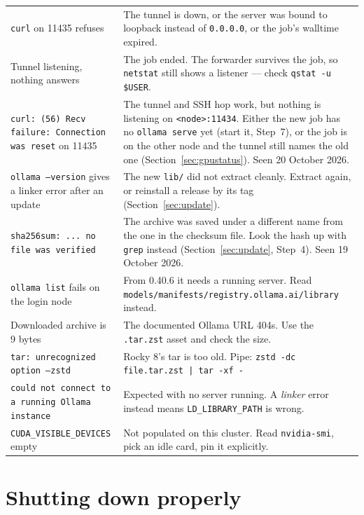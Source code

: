 \documentclass[11pt,a4paper]{article}
\begin{document}
\begin{center}
\begin{tabularx}{\linewidth}{@{}>{\raggedright\arraybackslash}p{4.6cm} X@{}}
\texttt{curl} on 11435 refuses & The tunnel is down, or the server was bound to
loopback instead of \texttt{0.0.0.0}, or the job's walltime expired. \\
Tunnel listening, nothing answers & The job ended. The forwarder survives the
job, so \texttt{netstat} still shows a listener --- check \texttt{qstat -u
\$USER}. \\
\texttt{curl: (56) Recv failure: Connection was reset} on 11435 & The tunnel
and SSH hop work, but nothing is listening on \texttt{<node>:11434}. Either the
new job has no \texttt{ollama serve} yet (start it, Step~7), or the job is on
the other node and the tunnel still names the old one
(Section~\ref{sec:gpustatus}). Seen 20 October 2026. \\
\texttt{ollama --version} gives a linker error after an update & The new
\texttt{lib/} did not extract cleanly. Extract again, or reinstall a release by
its tag (Section~\ref{sec:update}). \\
\texttt{sha256sum: ... no file was verified} & The archive was saved under a
different name from the one in the checksum file. Look the hash up with
\texttt{grep} instead (Section~\ref{sec:update}, Step~4). Seen 19 October 2026. \\
\texttt{ollama list} fails on the login node & From 0.40.6 it needs a running
server. Read \texttt{models/manifests/registry.ollama.ai/library} instead. \\Downloaded archive is 9 bytes & The documented Ollama URL 404s. Use the
\texttt{.tar.zst} asset and check the size. \\
\texttt{tar: unrecognized option --zstd} & Rocky 8's tar is too old. Pipe:
\texttt{zstd -dc file.tar.zst | tar -xf -} \\
\texttt{could not connect to a running Ollama instance} & Expected with no
server running. A \emph{linker} error instead means
\texttt{LD\_LIBRARY\_PATH} is wrong. \\
\texttt{CUDA\_VISIBLE\_DEVICES} empty & Not populated on this cluster. Read
\texttt{nvidia-smi}, pick an idle card, pin it explicitly. \\
\bottomrule
\end{tabularx}
\end{center}

\section{Shutting down properly}
\end{document}
